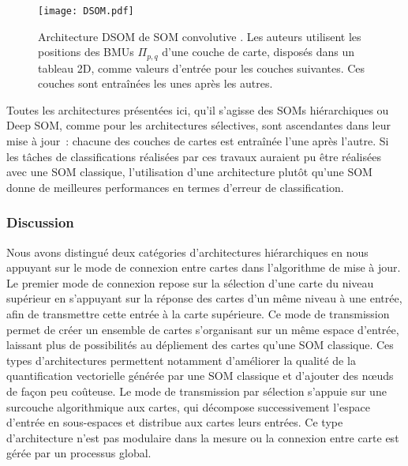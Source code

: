 \documentclass[../main]{subfiles}
\begin{document}
\begin{figure}[t]
    \texttt{[image: DSOM.pdf]}
    \caption{Architecture DSOM de SOM \og convolutive \fg{} \parencite{liu_deep_2015}. Les auteurs utilisent les positions des BMUs $\Pi_{p,q}$ d'une couche de carte, disposés dans un tableau 2D, comme valeurs d'entrée pour les couches suivantes. Ces couches sont entraînées les unes après les autres. \label{fig:dsom}}
\end{figure}

Toutes les architectures présentées ici, qu'il s'agisse des SOMs hiérarchiques ou Deep SOM, comme pour les architectures sélectives, sont ascendantes dans leur mise à jour~: chacune des couches de cartes est entraînée l'une après l'autre. 
Si les tâches de classifications réalisées par ces travaux auraient pu être réalisées avec une SOM classique, l'utilisation d'une architecture plutôt qu'une SOM donne de meilleures performances en termes d'erreur de classification.

\subsubsection{Discussion}

Nous avons distingué deux catégories d'architectures hiérarchiques en nous appuyant sur le mode de connexion entre cartes dans l'algorithme de mise à jour. 
Le premier mode de connexion repose sur la sélection d'une carte du niveau supérieur en s'appuyant sur la réponse des cartes d'un même niveau à une entrée, afin de transmettre cette entrée à la carte supérieure. Ce mode de transmission permet de créer un ensemble de cartes s'organisant sur un même espace d'entrée, laissant plus de possibilités au dépliement des cartes qu'une SOM classique. Ces types d'architectures permettent notamment d'améliorer la qualité de la quantification vectorielle générée par une SOM classique et d'ajouter des n\oe{}uds de façon peu coûteuse. Le mode de transmission par sélection s'appuie sur une surcouche algorithmique aux cartes, qui décompose successivement l'espace d'entrée en sous-espaces et distribue aux cartes leurs entrées. Ce type d'architecture n'est pas modulaire dans la mesure ou la connexion entre carte est gérée par un processus global.
\end{document}
